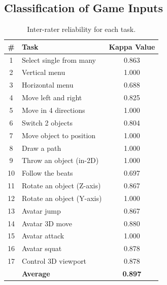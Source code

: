 \documentclass{sigchi}
\newcommand\tabhead[1]{\small\textbf{#1}}
\begin{document}
  \subsection{Classification of Game Inputs}

   \begin{table}
    \centering
    \begin{tabular}{|c|l|c|}
      \hline
      \tabhead{\#} &
      \multicolumn{1}{|p{0.4\columnwidth}|}{\centering\tabhead{Task}} &
      \multicolumn{1}{|p{0.2\columnwidth}|}{\centering\tabhead{Kappa Value}} \\
      \hline
      1 & Select single from many& 0.863\\
      \hline
      2 & Vertical menu & 1.000\\
      \hline
      3 & Horizontal menu & 0.688\\
      \hline
      4 & Move left and right & 0.825\\
      \hline
      5 & Move in 4 directions & 1.000\\
      \hline
      6 & Switch 2 objects & 0.804\\
      \hline
      7 & Move object to position & 1.000\\
      \hline
      8 & Draw a path & 1.000\\
      \hline
      9 & Throw an object (in-2D) & 1.000\\
      \hline
      10 & Follow the beats & 0.697\\
      \hline
      11 & Rotate an object (Z-axis) & 0.867 \\
      \hline
      12 & Rotate an object (Y-axis) & 1.000\\
      \hline
      13 & Avatar jump & 0.867\\
      \hline
      14 & Avatar 3D move & 0.880\\
      \hline
      15 & Avatar attack & 1.000\\
      \hline
      16 & Avatar squat & 0.878\\
      \hline
      17 & Control 3D viewport  & 0.878\\
      \hline
      & \bf{Average} & \bf{0.897}\\
      \hline

    \end{tabular}
    \caption{Inter-rater reliability for each task.}
    \label{tab:kappa}
  \end{table}
\end{document}
